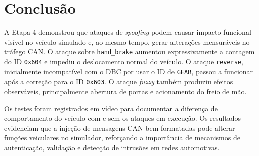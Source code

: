 \documentclass[12pt,a4paper]{article}
\begin{document}
\section{Conclus\~ao}

A Etapa 4 demonstrou que ataques de \textit{spoofing} podem causar impacto funcional
vis\'ivel no ve\'iculo simulado e, ao mesmo tempo, gerar altera\c{c}\~oes mensur\'aveis no
tr\'afego CAN. O ataque sobre \texttt{hand\_brake} aumentou expressivamente a contagem
do ID \texttt{0x604} e impediu o deslocamento normal do ve\'iculo. O ataque
\texttt{reverse}, inicialmente incompat\'ivel com o DBC por usar o ID de \texttt{GEAR},
passou a funcionar ap\'os a corre\c{c}\~ao para o ID \texttt{0x603}. O ataque
\textit{fuzzy} tamb\'em produziu efeitos observ\'aveis, principalmente abertura de portas
e acionamento do freio de m\~ao.

Os testes foram registrados em v\'ideo para documentar a diferen\c{c}a de comportamento
do ve\'iculo com e sem os ataques em execu\c{c}\~ao. Os resultados evidenciam que a
inje\c{c}\~ao de mensagens CAN bem formatadas pode alterar fun\c{c}\~oes veiculares no
simulador, refor\c{c}ando a import\^ancia de mecanismos de autentica\c{c}\~ao, valida\c{c}\~ao
e detec\c{c}\~ao de intrus\~oes em redes automotivas.
\end{document}
